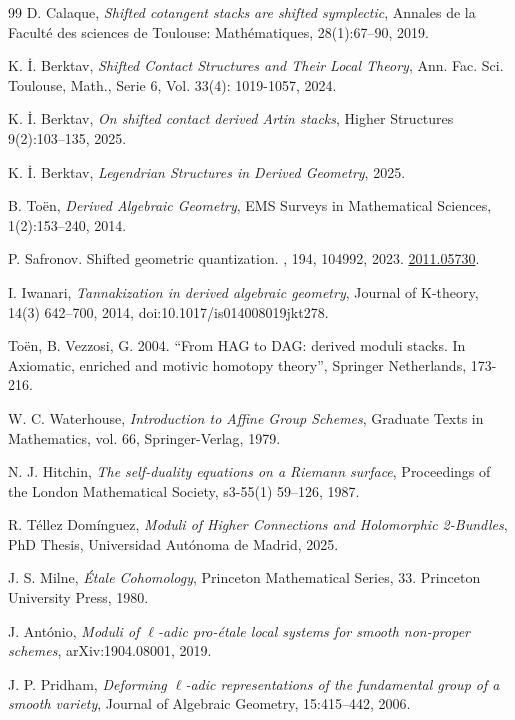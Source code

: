 \documentclass[reqno]{amsart}
\theoremstyle{definition}
\theoremstyle{remark}
\newcommand{\Arxiv}[1]{\href{http://arxiv.org/abs/#1}{#1}}
\begin{document}
{\begin{thebibliography}{99}
  D. Calaque,
  \textit{Shifted cotangent stacks are shifted symplectic},
  Annales de la Facult\'{e} des sciences de Toulouse:
  Math\'{e}matiques, 28(1):67--90, 2019.

  K. \.{I}. Berktav,
  \textit{Shifted Contact Structures and Their Local Theory}, Ann. Fac.
  Sci. Toulouse, Math., Serie 6, Vol. 33(4): 1019-1057, 2024.

  K. \.{I}. Berktav,
  \textit{On shifted contact derived Artin stacks},
  Higher Structures 9(2):103--135, 2025.

  K. \.{I}. Berktav,
  \textit{Legendrian Structures in Derived Geometry},
  2025.

  B. To\"{e}n,
  \textit{Derived Algebraic Geometry},
  EMS Surveys in Mathematical Sciences, 1(2):153--240, 2014.

    P. Safronov.
    \newblock Shifted geometric quantization. 
    , 194, 104992,
    2023. \Arxiv{2011.05730}.

    I. Iwanari,
    \textit{Tannakization in derived algebraic geometry},
    Journal of K-theory, 14(3) 642--700, 2014, doi:10.1017/is014008019jkt278.

    Toën, B. Vezzosi, G. 2004.  “From HAG to DAG: derived moduli stacks. In Axiomatic, enriched and motivic homotopy theory”,  Springer Netherlands, 173-216.

W. C. Waterhouse, \textit{Introduction to Affine Group Schemes}, Graduate Texts in Mathematics, vol. 66, Springer-Verlag, 1979.

   N. J. Hitchin, \textit{The self-duality equations on a Riemann surface}, Proceedings of the London Mathematical Society, s3-55(1) 59--126, 1987.
  
   R. T\'ellez Dom\'inguez, \textit{Moduli of Higher Connections and Holomorphic 2-Bundles}, PhD Thesis, Universidad Aut\'onoma de Madrid, 2025.

   J. S. Milne, \textit{\'{E}tale Cohomology}, Princeton Mathematical Series, 33. Princeton University Press, 1980.
  
   J. Ant\'onio, \textit{Moduli of $\ell$-adic pro-\'{e}tale local systems for smooth non-proper schemes}, arXiv:1904.08001, 2019.
  
   J. P. Pridham, \textit{Deforming $\ell$-adic representations of the fundamental group of a smooth variety}, Journal of Algebraic Geometry, 15:415--442, 2006.
  

\end{thebibliography}}
\end{document}
